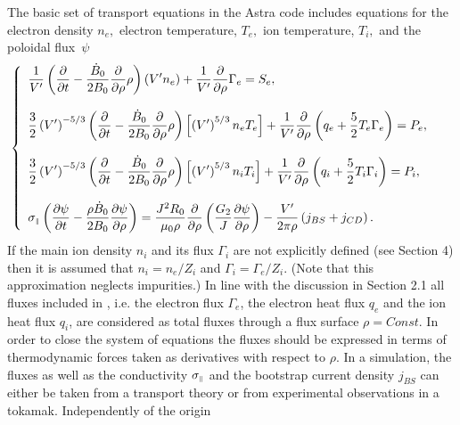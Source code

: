 The basic set of transport equations in the Astra code includes
equations for the electron density $n_e,$ electron temperature, $T_e,$
ion temperature, $T_i,$ and the poloidal flux~$\psi$ 
\begin{equation}\label{main}
\hspace*{-5mm}\lb\{
\begin{array}{l}\dstyle
\frac{1}{V'}\left(\prti{}{t}
-\frac{\dot B_0}{2B_0}\prti{}{\rho}\rho
\right)\left(V'n_e\right)
+\frac{1}{V'}\prti{}{\rho}
\Gamma_e
=S_e
,\bigskip\\ \dstyle
\frac{3}{2}\left(V'\right)^{-5/3}
\left(\prti{}{t}
-\frac{\dot B_0}{2B_0}\prti{}{\rho}\rho
\right)\left[
\left(V'\right)^{5/3}n_e T_e
\right]
+\frac{1}{V'}\prti{}{\rho}
\left(q_e+\frac{5}{2}T_e\Gamma_e
\right)
=P_e
,\bigskip\\ \dstyle
\frac{3}{2}\left(V'\right)^{-5/3}
\left(\prti{}{t}
-\frac{\dot B_0}{2B_0}\prti{}{\rho}\rho
\right)\left[
\left(V'\right)^{5/3}n_i T_i
\right]
+\frac{1}{V'}\prti{}{\rho}
\left(q_i+\frac{5}{2}T_i\Gamma_i
\right)
=P_i
,\bigskip\\ \dstyle
\sigma_\pll
\left(\prti{\psi}{t}
-\frac{\rho\dot B_0}{2B_0}\prti{\psi}{\rho}
\right)
=\frac{J^2R_0}{\mu_0\rho}\prti{}{\rho}
\left(\frac{G_2}{J}
\prti{\psi}{\rho}
\right)
-\frac{V'}{2\pi\rho}\left(j_{BS}+j_{CD}\right)
.\end{array}\rb.
\end{equation}
If the main ion density $n_i$ and its flux $\Gamma_i$ are not explicitly
defined (see Section 4) then it is assumed that $n_i=n_e/Z_i$ and
$\Gamma_i=\Gamma_e/Z_i.$  
(Note that this approximation neglects impurities.) 
In line with the discussion in Section 2.1 all fluxes included in
, i.e. the electron flux $\Gamma_e$, the electron heat flux
$q_e$ and the ion heat flux $q_i$, are considered as total fluxes
through a flux surface $\rho=Const.$ In order to close the system of
equations the fluxes should be expressed in terms of thermodynamic
forces taken as derivatives with respect to $\rho$. In a simulation, the
fluxes as well as the conductivity $\sigma_{\scriptscriptstyle\parallel}$ and the bootstrap
current density $j_{BS}$ can either be taken from a transport theory or
from experimental observations in a tokamak. Independently of the origin
